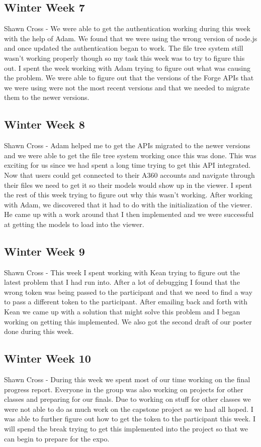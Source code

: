 \documentclass[10pt,draftclsnofoot,onecolumn]{IEEEtran}
\begin{document}
\subsection{Winter Week 7}
Shawn Cross - We were able to get the authentication working during this week with the help of Adam. We found that we were using the wrong version of node.js and once updated the authentication began to work. The file tree system still wasn't working properly though so my task this week was to try to figure this out. I spent the week working with Adam trying to figure out what was causing the problem. We were able to figure out that the versions of the Forge APIs that we were using were not the most recent versions and that we needed to migrate them to the newer versions.

\subsection{Winter Week 8}
Shawn Cross - Adam helped me to get the APIs migrated to the newer versions and we were able to get the file tree system working once this was done. This was exciting for us since we had spent a long time trying to get this API integrated. Now that users could get connected to their A360 accounts and navigate through their files we need to get it so their models would show up in the viewer. I spent the rest of this week trying to figure out why this wasn't working. After working with Adam, we discovered that it had to do with the initialization of the viewer. He came up with a work around that I then implemented and we were successful at getting the models to load into the viewer.

\subsection{Winter Week 9}
Shawn Cross - This week I spent working with Kean trying to figure out the latest problem that I had run into. After a lot of debugging I found that the wrong token was being passed to the participant and that we need to find a way to pass a different token to the participant. After emailing back and forth with Kean we came up with a solution that might solve this problem and I began working on getting this implemented. We also got the second draft of our poster done during this week.

\subsection{Winter Week 10}
Shawn Cross - During this week we spent most of our time working on the final progress report. Everyone in the group was also working on projects for other classes and preparing for our finals. Due to working on stuff for other classes we were not able to do as much work on the capstone project as we had all hoped. I was able to further figure out how to get the token to the participant this week. I will spend the break trying to get this implemented into the project so that we can begin to prepare for the expo.
\end{document}
